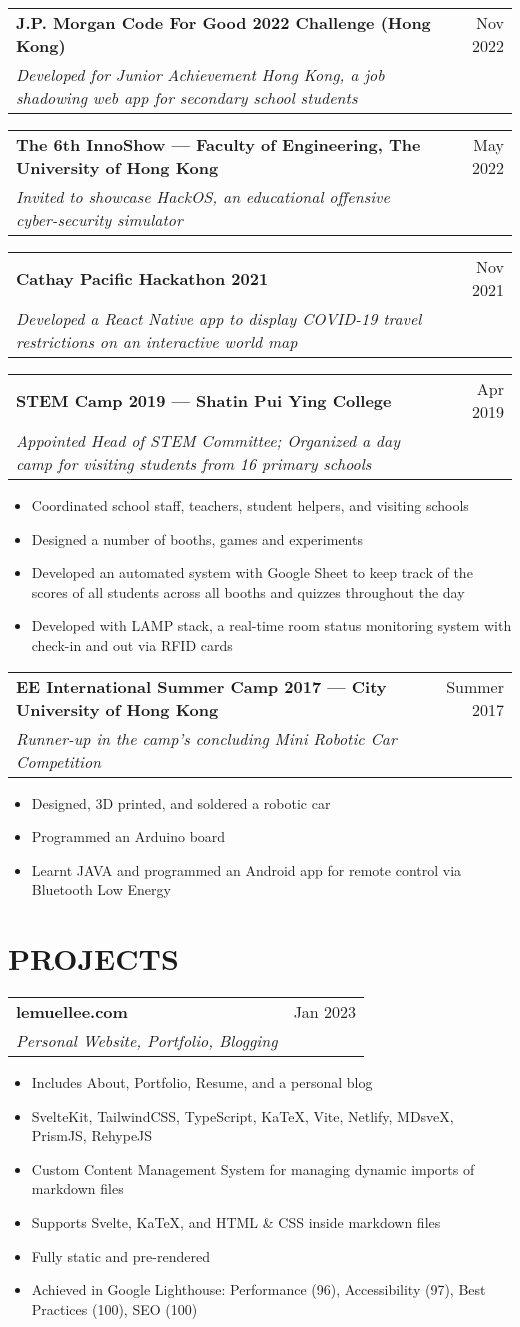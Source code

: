 \documentclass{article}
\newcommand{\jobTitle}[3]{
\begin{tabularx}{\linewidth}{ X r }
    \textbf{#1} & #2\\
    \textit{#3} &
\end{tabularx}
}
\begin{document}
\jobTitle
{J.P. Morgan Code For Good 2022 Challenge (Hong Kong)}
{Nov 2022}
{Developed for Junior Achievement Hong Kong, a job shadowing web app for secondary school students}

\jobTitle
{The 6th InnoShow --- Faculty of Engineering, The University of Hong Kong}
{May 2022}
{Invited to showcase HackOS, an educational offensive cyber-security simulator}

\jobTitle
{Cathay Pacific Hackathon 2021}
{Nov 2021}
{Developed a React Native app to display COVID-19 travel restrictions on an interactive world map}

\jobTitle
{STEM Camp 2019 --- Shatin Pui Ying College}
{Apr 2019}
{Appointed Head of STEM Committee; Organized a day camp for visiting students from 16 primary schools}
\begin{itemize}
    \item Coordinated school staff, teachers, student helpers, and visiting schools
    \item Designed a number of booths, games and experiments
    \item Developed an automated system with Google Sheet to keep track of the scores of all students across all booths and quizzes throughout the day
    \item Developed with LAMP stack, a real-time room status monitoring system with check-in and out via RFID cards
\end{itemize}

\jobTitle
{EE International Summer Camp 2017 --- City University of Hong Kong}
{Summer 2017}
{Runner-up in the camp's concluding Mini Robotic Car Competition}
\begin{itemize}
    \item Designed, 3D printed, and soldered a robotic car
    \item Programmed an Arduino board
    \item Learnt JAVA and programmed an Android app for remote control via Bluetooth Low Energy
\end{itemize}

\section{PROJECTS}

\jobTitle
{lemuellee.com}
{Jan 2023}
{Personal Website, Portfolio, Blogging}
\begin{itemize}
    \item Includes About, Portfolio, Resume, and a personal blog
    \item SvelteKit, TailwindCSS, TypeScript, KaTeX, Vite, Netlify, MDsveX, PrismJS, RehypeJS
    \item Custom Content Management System for managing dynamic imports of markdown files
	\item Supports Svelte, KaTeX, and HTML \& CSS inside markdown files
	\item Fully static and pre-rendered
	\item Achieved in Google Lighthouse: Performance (96), Accessibility (97), Best Practices (100), SEO (100)
\end{itemize}
\end{document}
